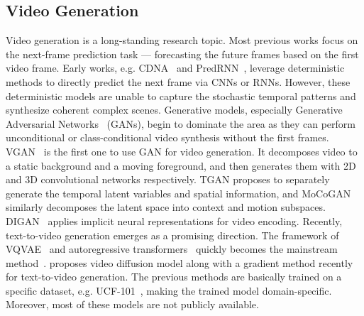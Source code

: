 \subsection{Video Generation}
Video generation is a long-standing research topic. Most previous works 
focus on the next-frame prediction task --- forecasting the future frames based on the first video frame. Early works, e.g. CDNA~\cite{finn2016unsupervised} and PredRNN~\cite{wang2017predrnn}, leverage deterministic methods to directly predict the next frame via CNNs or RNNs.
However, these deterministic models are unable to capture the stochastic temporal patterns and synthesize coherent complex scenes. 
Generative models, especially  Generative Adversarial Networks~\cite{goodfellow2014generative} (GANs), begin to dominate the area
as they can perform unconditional or class-conditional video synthesis without the first frames. 
VGAN~\cite{vondrick2016generating} is the first one
to use GAN for video generation. It decomposes video to a static background and a moving foreground, and then generates them with 2D and 3D convolutional networks respectively. TGAN\cite{saito2017temporal} proposes to separately generate the temporal latent variables and spatial information, and MoCoGAN~\cite{tulyakov2018mocogan} similarly decomposes the latent space into context and motion subspaces. DIGAN~\cite{yu2022generating} applies implicit neural representations for video encoding. 
Recently, text-to-video generation emerges as a promising direction. The framework of VQVAE~\cite{van2017neural} and autoregressive transformers~\cite{vaswani2017attention,brown2020language} quickly becomes the mainstream method~\cite{wu2021godiva, wu2021n, ge2022long}. \citet{ho2022video} proposes video diffusion model along with a gradient method recently for text-to-video generation. The previous methods are basically trained on a specific dataset, e.g. UCF-101~\cite{soomro2012ucf101}, making the trained model domain-specific. 
Moreover, most of these models are not publicly available. 

